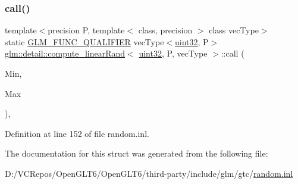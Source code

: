 \subsubsection{\texorpdfstring{call()}{call()}}
{\footnotesize\ttfamily template$<$precision P, template$<$ class, precision $>$ class vec\+Type$>$ \\
static \mbox{\hyperlink{setup_8hpp_a33fdea6f91c5f834105f7415e2a64407}{G\+L\+M\+\_\+\+F\+U\+N\+C\+\_\+\+Q\+U\+A\+L\+I\+F\+I\+ER}} vec\+Type$<$\mbox{\hyperlink{namespaceglm_1_1detail_ade6cfbf377022aaa391af8cd50489222}{uint32}}, P$>$ \mbox{\hyperlink{structglm_1_1detail_1_1compute__linear_rand}{glm\+::detail\+::compute\+\_\+linear\+Rand}}$<$ \mbox{\hyperlink{namespaceglm_1_1detail_ade6cfbf377022aaa391af8cd50489222}{uint32}}, P, vec\+Type $>$\+::call (\begin{DoxyParamCaption}\item[{vec\+Type$<$ \mbox{\hyperlink{namespaceglm_1_1detail_ade6cfbf377022aaa391af8cd50489222}{uint32}}, P $>$ const \&}]{Min,  }\item[{vec\+Type$<$ \mbox{\hyperlink{namespaceglm_1_1detail_ade6cfbf377022aaa391af8cd50489222}{uint32}}, P $>$ const \&}]{Max }\end{DoxyParamCaption})\hspace{0.3cm}{\ttfamily [inline]}, {\ttfamily [static]}}



Definition at line 152 of file random.\+inl.



The documentation for this struct was generated from the following file\+:\begin{DoxyCompactItemize}
\item 
D\+:/\+V\+C\+Repos/\+Open\+G\+L\+T6/\+Open\+G\+L\+T6/third-\/party/include/glm/gtc/\mbox{\hyperlink{random_8inl}{random.\+inl}}\end{DoxyCompactItemize}

